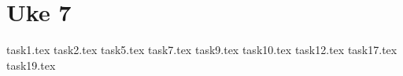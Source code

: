 \section{Uke 7}

{task1.tex}
{task2.tex}
{task5.tex}
{task7.tex}
{task9.tex}
{task10.tex}
{task12.tex}
{task17.tex}
{task19.tex}